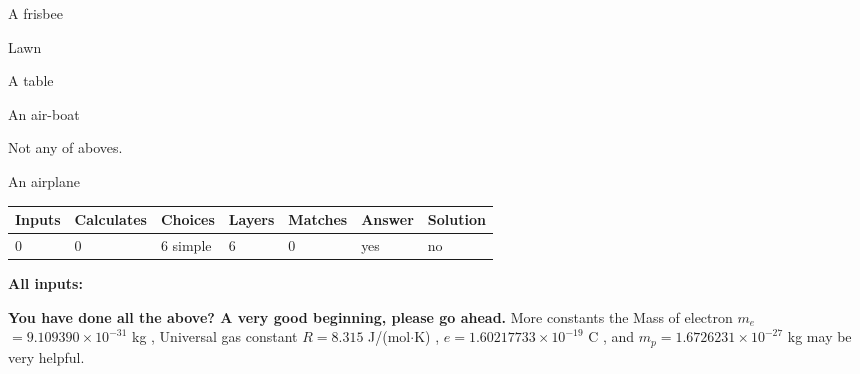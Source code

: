 \documentclass[12pt]{article}
\begin{document}
 
A frisbee
 
 
Lawn
 
 
A table
 
 
An air-boat
 
 
  Not any of aboves.
 
 
\noindent{}
 
 
An airplane
 
 
\noindent{}
 
 
 
\vspace{0.3in}
   
   
   
   
\noindent\begin{tabular}{|l|l|l|l|l|l|l|}
 \hline
Inputs & Calculates & Choices & Layers & Matches & Answer & Solution \\ \hline
           0 & 
           0 & 
           6
  simple  
  & 
           6 & 
           0 & 
  yes & 
  no 
  \\ \hline
 \end{tabular}
   
   
   
   
\noindent{}
   
   
   
   
\noindent\vspace{0.1in}\hspace{-0.08in} {\textbf{\Large{All inputs: }}}
   
   
   
   
\vspace{0.3in}
{\textbf{\LARGE{You have done all the above? A very good beginning, please go ahead.}}}
More constants the
Mass of electron
$m_e$$ =
9.109390 \times 10^{-31} $
kg
,
Universal gas constant
$R$$ =
8.315 $
J/(mol$\cdot $K)
,
$e$$ =
1.60217733 \times 10^{-19} $
C
, and
$m_p$$ =
1.6726231 \times 10^{-27} $
kg
%
may be very helpful.
\vspace{0.3in}
   
   
  
\vspace{0.2in}
  
\end{document}
